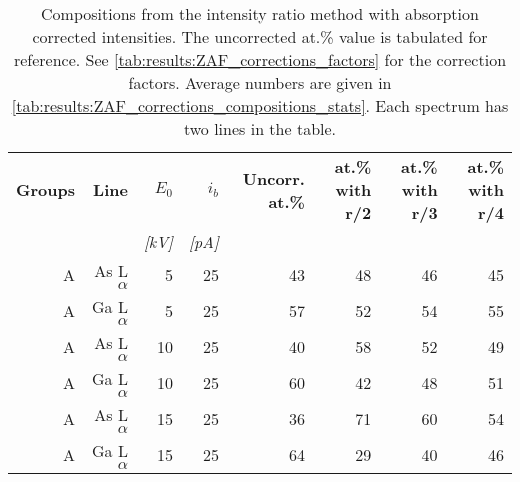 \begin{table}[phtb]
    \begin{center}
        \caption{
            Compositions from the intensity ratio method with absorption corrected intensities. The uncorrected at.\% value is tabulated for reference.
            See \cref{tab:results:ZAF_corrections_factors} for the correction factors.
            Average numbers are given in \cref{tab:results:ZAF_corrections_compositions_stats}.
            Each spectrum has two lines in the table.
        }
        \label{tab:results:ZAF_corrections_compositions}
        \begin{tabular}{rrrrrrrr}
            \hline
            \textbf{Groups} & \textbf{Line} & \textbf{$E_0$} & \textbf{$i_b$} & \textbf{Uncorr. at.\%} & \textbf{at.\% with r/2} & \textbf{at.\% with r/3} & \textbf{at.\% with r/4} \\
            \emph{}         & \emph{}       & \emph{[kV]}    & \emph{[pA]}    & \emph{}                & \emph{}                 & \emph{}                 & \emph{}                 \\
            \hline
            A               & As L$\alpha$  & 5              & 25             & 43                     & 48                      & 46                      & 45                      \\
            A               & Ga L$\alpha$  & 5              & 25             & 57                     & 52                      & 54                      & 55                      \\
            A               & As L$\alpha$  & 10             & 25             & 40                     & 58                      & 52                      & 49                      \\
            A               & Ga L$\alpha$  & 10             & 25             & 60                     & 42                      & 48                      & 51                      \\
            A               & As L$\alpha$  & 15             & 25             & 36                     & 71                      & 60                      & 54                      \\
            A               & Ga L$\alpha$  & 15             & 25             & 64                     & 29                      & 40                      & 46                      \\

\end{tabular}
\end{center}
\end{table}
